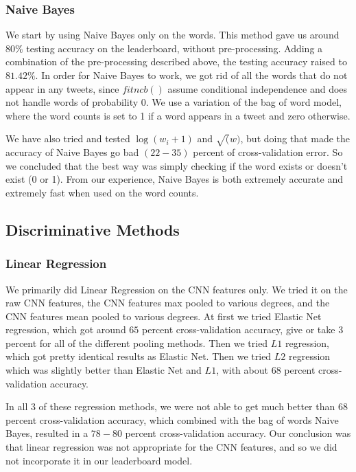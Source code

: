 \documentclass[11pt,twocolumn]{report}
\begin{document}
    \subsubsection{Naive Bayes}
    We start by using Naive Bayes only on the words. This method gave us around $80 \%$ testing accuracy on the leaderboard, without pre-processing. Adding a combination of the pre-processing described above, the testing accuracy raised to $81.42\%$. In order for Naive Bayes to work, we got rid of all the words that do not appear in any tweets, since $fitncb()$ assume conditional independence and does not handle words of probability $0$. We use a variation of the bag of word model, where the word counts is set to 1 if a word appears in a tweet and zero otherwise.
    \par
    We have also tried and tested $\log(w_i + 1)$ and $\sqrt(w)$, but doing that made the accuracy of Naive Bayes go bad $(22-35)$ percent of cross-validation error. So we concluded that the best way was simply checking if the word exists or doesn't exist (0 or 1). From our experience, Naive Bayes is both extremely accurate and extremely fast when used on the word counts.   
   
    
    \subsection*{Discriminative Methods}
    \subsubsection{Linear Regression}
	We primarily did Linear Regression on the CNN features only. We tried it on the raw CNN features, the CNN features max pooled to various degrees, and the CNN features mean pooled to various degrees. At first we tried Elastic Net regression, which got around $65$ percent cross-validation accuracy, give or take $3$ percent for all of the different pooling methods. Then we tried $L1$ regression, which got pretty identical results as Elastic Net. Then we tried $L2$ regression which was slightly better than Elastic Net and $L1$, with about $68$ percent cross-validation accuracy. 
    \par
    In all 3 of these regression methods, we were not able to get much better than $68$ percent cross-validation accuracy, which combined with the bag of words Naive Bayes, resulted in a $78-80$ percent cross-validation accuracy. Our conclusion was that linear regression was not appropriate for the CNN features, and so we did not incorporate it in our leaderboard model. 
    
\end{document}
